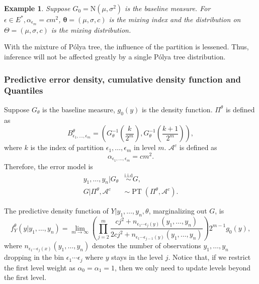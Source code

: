 \documentclass[12pt]{article}
\newtheorem{emp}[thm]{Example}
\newcommand{\polya}{P\'{o}lya}
\newcommand{\iid}{\stackrel{\mbox{i.i.d}}{\sim}}
\DeclareMathOperator{\pt}{PT}
\begin{document}
\begin{emp}
  Suppose $G_0 = \mathrm{N}(\mu, \sigma^2)$ is the baseline measure.
  For $\epsilon \in E^{*}, \alpha_{\epsilon_m} = cm^2 $, $\bm{\theta}=
  (\mu, \sigma, c)$ is the mixing index and the distribution on
  $\Theta = (\mu, \sigma, c) $ is the mixing distribution.
\end{emp}
With the mixture of \polya{} tree, the influence of the partition is
lessened. Thus, inference will not be affected greatly by a single
\polya{} tree distribution.

\subsubsection{Predictive error density, cumulative density function
  and Quantiles}
Suppose $G_{\theta}$ is the baseline
measure, $g_0(y)$ is the density
function. $\Pi^{\theta}$ is defined as
\begin{displaymath}
  B^{\theta}_{\epsilon_1, \ldots, \epsilon_m} = \left( G^{-1}_{\theta}
    \left( \frac{k}{2^m} \right), G^{-1}_{\theta}\left( \frac{k+1}{2^m} \right) \right),
\end{displaymath}
where $k$ is the index of partition $\epsilon_1, \ldots, \epsilon_m$
in level $m$. $\mathcal{A}^c$ is defined as
\begin{displaymath}
  \alpha_{\epsilon_1, \ldots, \epsilon_m} = cm^2.
\end{displaymath}
Therefore, the error model is
\begin{align*}
  y_1, \ldots, y_n |G_{\theta} & \iid G, \\
  G|\Pi^{\theta}, \mathcal{A}^{c} & \sim \pt (\Pi^{\theta},
  \mathcal{A}^{c}).
\end{align*}

The predictive density function of $Y|y_1, \ldots, y_n, \theta$,
marginalizing out $G$, is
\begin{equation}
  \label{ch2:eq:pred}
  f_Y^{\theta} (y|y_1, \ldots, y_n)  = \lim_{m \to \infty} \left(
    \prod_{j=2}^m \frac{cj^2 + n_{\epsilon_1 \cdots \epsilon_j(y) }(y_1, \ldots, y_n)}{2cj^2
      + n_{\epsilon_1 \cdots \epsilon_{j-1}(y)}(y_1, \ldots, y_n)}
  \right)2^{m-1} g_0(y),
\end{equation}
where $n_{\epsilon_1 \cdots \epsilon_j(x) }(y_1, \ldots, y_n)$
denotes the number of observations $y_1, \ldots, y_n$ dropping in the
bin $\epsilon_1 \cdots \epsilon_j$ where $y$ stays in the level
$j$. Notice that, if we restrict the first level weight as
$\alpha_0=\alpha_1=1$, then we only need to update levels beyond
the first level.
\end{document}

